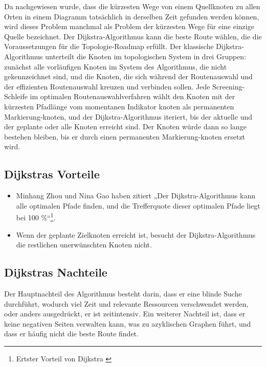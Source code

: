 Da nachgewiesen wurde, dass die kürzesten Wege von einem Quellknoten zu allen Orten in einem Diagramm tatsächlich in derselben Zeit gefunden werden können, wird dieses Problem manchmal als Problem der kürzesten Wege für eine einzige Quelle bezeichnet\cite{SSRN-id2340905}.
\newline
\newline
Der Dijkstra-Algorithmus kann die beste Route wählen, die die Voraussetzungen für die Topologie-Roadmap erfüllt. Der klassische Dijkstra-Algorithmus unterteilt die Knoten im topologischen System in drei Gruppen: zunächst alle vorläufigen Knoten im System des Algorithmus, die nicht gekennzeichnet sind, und die Knoten, die sich während der Routenauswahl und der effizienten Routenauswahl kreuzen und verbinden sollen. Jede Screening-Schleife im optimalen Routenauswahlverfahren wählt den Knoten mit der kürzesten Pfadlänge vom momentanen Indikator knoten als permanenten Markierung-knoten, und der Dijkstra-Algorithmus iteriert, bis der aktuelle und der geplante oder alle Knoten erreicht sind. Der Knoten würde dann so lange bestehen bleiben, bis er durch einen permanenten Markierung-knoten ersetzt wird\cite{Research-id5}.

\subsection{Dijkstras Vorteile}

\begin{itemize}
	\item Minhang Zhou und Nina Gao haben zitiert „Der Dijkstra-Algorithmus kann alle optimalen Pfade finden, und die Trefferquote dieser optimalen Pfade liegt bei 100 \%“\footnote{Ertster Vorteil von Dijkstra \cite{Research-id5}}.
	\item Wenn der geplante Zielknoten erreicht ist, besucht der Dijkstra-Algorithmus die restlichen unerwünschten Knoten nicht\cite{Research-id7}. 
\end{itemize}


\subsection{Dijkstras Nachteile}

Der Hauptnachteil des Algorithmus besteht darin, dass er eine blinde Suche durchführt, wodurch viel Zeit und relevante Ressourcen verschwendet werden, oder anders ausgedrückt, er ist zeitintensiv. Ein weiterer Nachteil ist, dass er keine negativen Seiten verwalten kann, was zu azyklischen Graphen führt, und dass er häufig nicht die beste Route findet\cite{Research-id8}.

